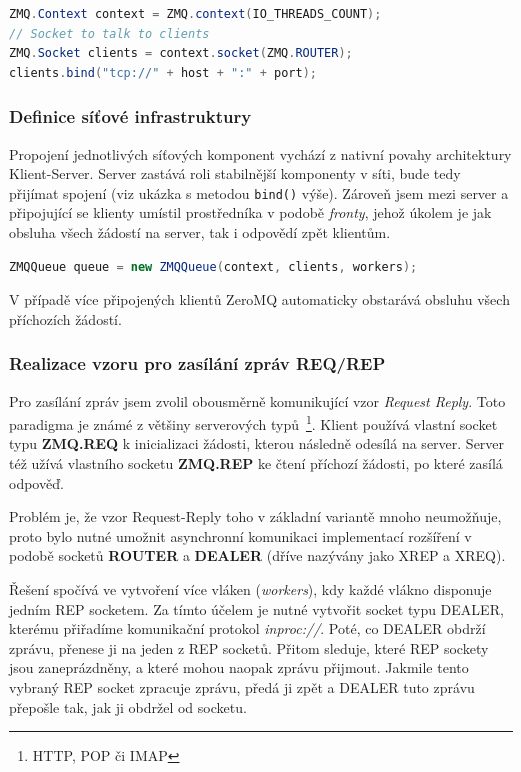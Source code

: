 \documentclass[thesis=M,czech]{FITthesis}[2014/05/07]
\begin{document}
\begin{lstlisting}[language=java]
ZMQ.Context context = ZMQ.context(IO_THREADS_COUNT);
// Socket to talk to clients
ZMQ.Socket clients = context.socket(ZMQ.ROUTER);
clients.bind("tcp://" + host + ":" + port);
\end{lstlisting}

\subsubsection{Definice síťové infrastruktury}
\label{subsub:queue}
Propojení jednotlivých síťových komponent vychází z nativní povahy architektury Klient-Server. Server zastává roli stabilnější komponenty v síti, bude tedy přijímat spojení (viz ukázka s metodou \texttt{bind()} výše). Zároveň jsem mezi server a připojující se klienty umístil prostředníka v podobě \emph{fronty}, jehož úkolem je jak obsluha všech žádostí na server, tak i odpovědí zpět klientům.

\begin{lstlisting}[language=java]
ZMQQueue queue = new ZMQQueue(context, clients, workers);
\end{lstlisting}

V případě více připojených klientů ZeroMQ automaticky obstarává obsluhu všech příchozích žádostí. 

\subsubsection{Realizace vzoru pro zasílání zpráv REQ/REP}
Pro zasílání zpráv jsem zvolil obousměrně komunikující vzor \emph{Request Reply}. Toto paradigma je známé z většiny serverových typů~\footnote{HTTP, POP či IMAP}. Klient používá vlastní socket typu \textbf{ZMQ.REQ} k inicializaci žádosti, kterou následně odesílá na server. Server též užívá vlastního socketu \textbf{ZMQ.REP} ke čtení příchozí žádosti, po které zasílá odpověď. 

Problém je, že vzor Request-Reply toho v základní variantě mnoho neumožňuje, proto bylo nutné umožnit asynchronní komunikaci implementací rozšíření v podobě socketů \textbf{ROUTER} a \textbf{DEALER} (dříve nazývány jako XREP a XREQ). 

Řešení spočívá ve vytvoření více vláken (\emph{workers}), kdy každé vlákno disponuje jedním REP socketem. Za tímto účelem je nutné vytvořit socket typu DEALER, kterému přiřadíme komunikační protokol \emph{inproc://}. Poté, co DEALER obdrží zprávu, přenese ji na jeden z REP socketů. Přitom sleduje, které REP sockety jsou zaneprázdněny, a které mohou naopak zprávu přijmout. Jakmile tento vybraný REP socket zpracuje zprávu, předá ji zpět a DEALER tuto zprávu přepošle tak, jak ji obdržel od socketu.
\end{document}
